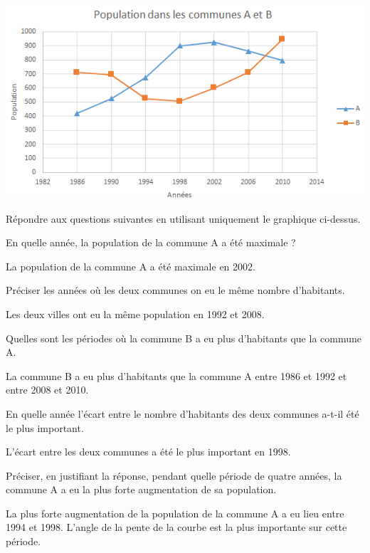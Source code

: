 \documentclass[a4paper,11pt]{exam}
\begin{document}
	\begin{center}
		\includegraphics[scale=0.7]{./graph}
	\end{center}



Répondre aux questions suivantes en utilisant uniquement le graphique ci-dessus.

\begin{questions}
	\question En quelle année, la population de la commune A a été maximale ?
	\begin{solution}
		La population de la commune A a été maximale en 2002.
	\end{solution}
	
	\question Préciser les années où les deux communes on eu le même nombre d'habitants.
	\begin{solution}
		Les deux villes ont eu la même population en 1992 et 2008.
	\end{solution}
	
	\question Quelles sont les périodes où la commune B a eu plus d'habitants que la commune A.
	\begin{solution}
		La commune B a eu plus d'habitants que la commune A entre 1986 et 1992 et entre 2008 et 2010.
	\end{solution}
	
	\question En quelle année l'écart entre le nombre d'habitants des deux communes a-t-il été le plus important.
	\begin{solution}
		L'écart entre les deux communes a été le plus important en 1998.
	\end{solution}
	
	\question Préciser, en justifiant la réponse, pendant quelle période de quatre années, la commune A a eu la plus forte augmentation de sa population.
	\begin{solution}
		La plus forte augmentation de la population de la commune A a eu lieu entre 1994 et 1998. L'angle de la pente de la courbe est la plus importante sur cette période.
	\end{solution}
\end{questions}
\end{document}
